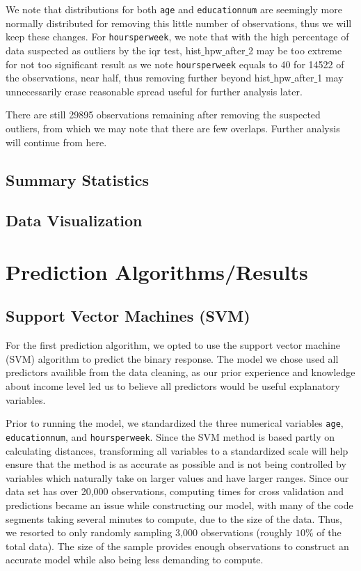 \documentclass{article}
\begin{document}
    We note that distributions for both \texttt{age} and \texttt{educationnum} are seemingly more normally distributed for removing this little number of observations, thus we will keep these changes. For \texttt{hoursperweek}, we note that with the high percentage of data suspected as outliers by the iqr test, hist$\_$hpw$\_$after$\_$2 may be too extreme for not too significant result as we note \texttt{hoursperweek} equals to 40 for 14522 of the observations, near half, thus removing further beyond hist$\_$hpw$\_$after$\_$1 may unnecessarily erase reasonable spread useful for further analysis later.  

    There are still 29895 observations remaining after removing the suspected outliers, from which we may note that there are few overlaps. Further analysis will continue from here.
    
    \subsection{Summary Statistics}
    \hspace{\parindent} 

    
    \subsection{Data Visualization}
    \hspace{\parindent} 

    
\section{Prediction Algorithms/Results}
    \subsection{Support Vector Machines (SVM)}   

    For the first prediction algorithm, we opted to use the support vector machine (SVM) algorithm to predict the binary response. The model we chose used all predictors availible from the data cleaning, as our prior experience and knowledge about income level led us to believe all predictors would be useful explanatory variables. 
    
    Prior to running the model, we standardized the three numerical variables \texttt{age}, \texttt{educationnum}, and \texttt{hoursperweek}. Since the SVM method is based partly on calculating distances, transforming all variables to a standardized scale will help ensure that the method is as accurate as possible and is not being controlled by variables which naturally take on larger values and have larger ranges. Since our data set has over 20,000 observations, computing times for cross validation and predictions became an issue while constructing our model, with many of the code segments taking several minutes to compute, due to the size of the data. Thus, we resorted to only randomly sampling 3,000 observations (roughly $10\%$ of the total data). The size of the sample provides enough observations to construct an accurate model while also being less demanding to compute.  \par 
    
\end{document}
